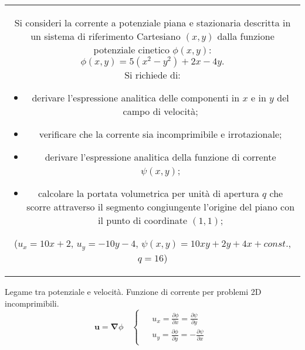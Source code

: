 \noindent
\begin{tabular}{c}
\begin{minipage}[b]{0.95\textwidth}
\begin{exerciseS}
Si consideri la corrente a potenziale piana e stazionaria descritta in un sistema
di riferimento Cartesiano $(x,y)$ dalla funzione potenziale cinetico $\phi(x,y)$:
$$
 \phi(x,y) = 5(x^2-y^2) + 2x-4y.
$$
Si richiede di:
\begin{itemize}
 \item derivare l'espressione analitica delle componenti in $x$ e in $y$ del campo di velocit\`{a};
 \item verificare che la corrente sia incomprimibile e irrotazionale;
 \item derivare l'espressione analitica della funzione di corrente $\psi(x,y)$;
 \item calcolare la portata volumetrica per unit\`{a} di apertura $q$ che scorre attraverso il 
       segmento congiungente l'origine del piano con il punto di coordinate $(1,1)$;
\end{itemize}
\vspace{0.2cm}
($u_x=10x+2$, $u_y=-10y-4$, $\psi(x,y)=10xy+2y+4x + const.$, $q=16$)
\end{exerciseS}
\end{minipage}
\end{tabular}


\sol

\partone
  Legame tra potenziale e velocità. Funzione di corrente per problemi 2D incomprimibili.
\begin{equation}
  \bm{u} = \bm{\nabla} \phi \quad
  \begin{cases}
  \begin{aligned}
   & u_x  =  \frac{\partial \phi}{\partial x}  = \frac{\partial \psi}{\partial y} \\
   & u_y  =  \frac{\partial \phi}{\partial y}  = - \frac{\partial \psi}{\partial x}
  \end{aligned}
  \end{cases}
\end{equation}

\parttwo

